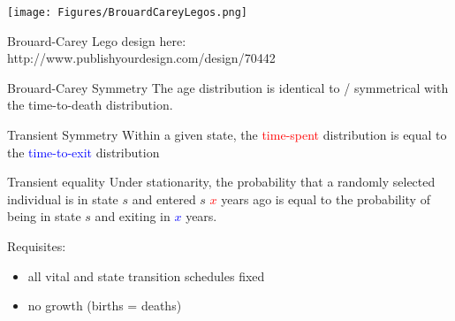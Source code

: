 \documentclass[20pt,usenames,dvipsnames]{beamer}
\begin{document}
\begin{frame}[plain]
\texttt{[image: Figures/BrouardCareyLegos.png]}

Brouard-Carey Lego design here:\\
http://www.publishyourdesign.com/design/70442
\end{frame}


\begin{frame}[plain]
\Large
 \begin{block}{Brouard-Carey Symmetry}
  The age distribution is identical to / symmetrical with the time-to-death distribution.
 \end{block}
\end{frame}

\begin{frame}[plain]
\Large
 \begin{block}{Transient Symmetry}
  Within a given \textcolor{OliveGreen}{state}, the \textcolor{red}{time-spent}
  distribution is equal to the \textcolor{blue}{time-to-exit} distribution
 \end{block}
\end{frame}

\begin{frame}[plain]
\Large
 \begin{block}{Transient equality}
  Under stationarity, the probability that a randomly selected individual is in
  state \textcolor{OliveGreen}{$s$} and entered \textcolor{OliveGreen}{$s$}
  \textcolor{red}{$x$} years ago is equal to the probability of being in state
  \textcolor{OliveGreen}{$s$} and exiting in \textcolor{blue}{$x$} years.
 \end{block}
\end{frame}

\begin{frame}[plain]
\Large
\centering
Requisites:
\begin{itemize}
\item all vital and state transition schedules fixed
\item no growth (births = deaths)
\end{itemize}
\end{frame}
\end{document}
